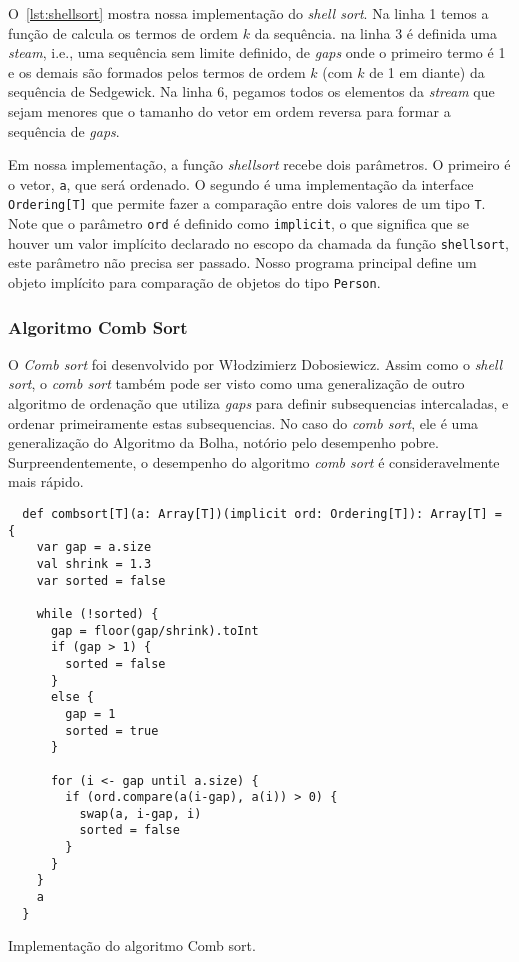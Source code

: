 \documentclass[a4paper,12pt]{scrartcl}
\begin{document}
O~\autoref{lst:shellsort} mostra nossa implementação do \emph{shell sort}. Na
linha 1 temos a função de calcula os termos de ordem $k$ da sequência. na linha
3 é definida uma \emph{steam}, i.e., uma sequência sem limite definido, de
\emph{gaps} onde o primeiro termo é 1 e os demais são formados pelos termos de
ordem $k$ (com $k$ de 1 em diante) da sequência de Sedgewick. Na linha 6,
pegamos todos os elementos da \emph{stream} que sejam menores que o tamanho do
vetor em ordem reversa para formar a sequência de \emph{gaps}.

Em nossa implementação, a função \emph{shellsort} recebe dois parâmetros. O
primeiro é o vetor, \texttt{a}, que será ordenado. O segundo é uma implementação
da interface \texttt{Ordering[T]} que permite fazer a comparação
entre dois valores de um tipo \texttt{T}. Note que o parâmetro \texttt{ord} é
definido como \texttt{implicit}, o que significa que se houver um
valor implícito declarado no escopo da chamada da função \texttt{shellsort},
este parâmetro não precisa ser passado. Nosso programa principal define um
objeto implícito para comparação de objetos do tipo \texttt{Person}.


\subsubsection{Algoritmo Comb Sort}
\label{sec:algoritmo-comb-sort}

O \emph{Comb sort} foi desenvolvido por Włodzimierz Dobosiewicz. Assim como o
\emph{shell sort}, o \emph{comb sort} também pode ser visto como uma
generalização de outro algoritmo de ordenação que utiliza \emph{gaps} para
definir subsequencias intercaladas, e ordenar primeiramente estas subsequencias.
No caso do \emph{comb sort}, ele é uma generalização do Algoritmo da Bolha,
notório pelo desempenho pobre. Surpreendentemente, o desempenho do algoritmo
\emph{comb sort} é consideravelmente mais rápido.

\begin{listing}
\begin{verbatim}
  def combsort[T](a: Array[T])(implicit ord: Ordering[T]): Array[T] = {
    var gap = a.size
    val shrink = 1.3
    var sorted = false

    while (!sorted) {
      gap = floor(gap/shrink).toInt
      if (gap > 1) {
        sorted = false
      }
      else {
        gap = 1
        sorted = true
      }

      for (i <- gap until a.size) {
        if (ord.compare(a(i-gap), a(i)) > 0) {
          swap(a, i-gap, i)
          sorted = false
        }
      }
    }
    a
  }
\end{verbatim}
\caption{Implementação do algoritmo Comb sort.}
\label{lst:combsort}
\end{listing}
\end{document}
